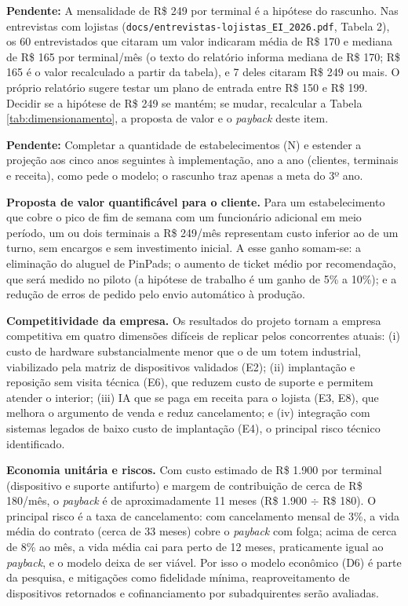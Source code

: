 \documentclass[12pt,a4paper]{article}
\newcommand{\pendente}[1]{\begin{pendbox}\textbf{\color{pendfg}Pendente:} #1\end{pendbox}}
\begin{document}
\pendente{A mensalidade de R\$ 249 por terminal é a hipótese do rascunho. Nas entrevistas com lojistas (\texttt{docs/entrevistas-lojistas\_EI\_2026.pdf}, Tabela 2), os 60 entrevistados que citaram um valor indicaram média de R\$ 170 e mediana de R\$ 165 por terminal/mês (o texto do relatório informa mediana de R\$ 170; R\$ 165 é o valor recalculado a partir da tabela), e 7 deles citaram R\$ 249 ou mais. O próprio relatório sugere testar um plano de entrada entre R\$ 150 e R\$ 199. Decidir se a hipótese de R\$ 249 se mantém; se mudar, recalcular a Tabela \ref{tab:dimensionamento}, a proposta de valor e o \textit{payback} deste item.}

\pendente{Completar a quantidade de estabelecimentos (N) e estender a projeção aos cinco anos seguintes à implementação, ano a ano (clientes, terminais e receita), como pede o modelo; o rascunho traz apenas a meta do 3º ano.}

\textbf{Proposta de valor quantificável para o cliente.} Para um estabelecimento que cobre o pico de fim de semana com um funcionário adicional em meio período, um ou dois terminais a R\$ 249/mês representam custo inferior ao de um turno, sem encargos e sem investimento inicial. A esse ganho somam-se: a eliminação do aluguel de PinPads; o aumento de ticket médio por recomendação, que será medido no piloto (a hipótese de trabalho é um ganho de 5\% a 10\%); e a redução de erros de pedido pelo envio automático à produção.

\textbf{Competitividade da empresa.} Os resultados do projeto tornam a empresa competitiva em quatro dimensões difíceis de replicar pelos concorrentes atuais: (i) custo de hardware substancialmente menor que o de um totem industrial, viabilizado pela matriz de dispositivos validados (E2); (ii) implantação e reposição sem visita técnica (E6), que reduzem custo de suporte e permitem atender o interior; (iii) IA que se paga em receita para o lojista (E3, E8), que melhora o argumento de venda e reduz cancelamento; e (iv) integração com sistemas legados de baixo custo de implantação (E4), o principal risco técnico identificado.

\textbf{Economia unitária e riscos.} Com custo estimado de R\$ 1.900 por terminal (dispositivo e suporte antifurto) e margem de contribuição de cerca de R\$ 180/mês, o \textit{payback} é de aproximadamente 11 meses (R\$ 1.900 $\div$ R\$ 180). O principal risco é a taxa de cancelamento: com cancelamento mensal de 3\%, a vida média do contrato (cerca de 33 meses) cobre o \textit{payback} com folga; acima de cerca de 8\% ao mês, a vida média cai para perto de 12 meses, praticamente igual ao \textit{payback}, e o modelo deixa de ser viável. Por isso o modelo econômico (D6) é parte da pesquisa, e mitigações como fidelidade mínima, reaproveitamento de dispositivos retornados e cofinanciamento por subadquirentes serão avaliadas.
\end{document}
